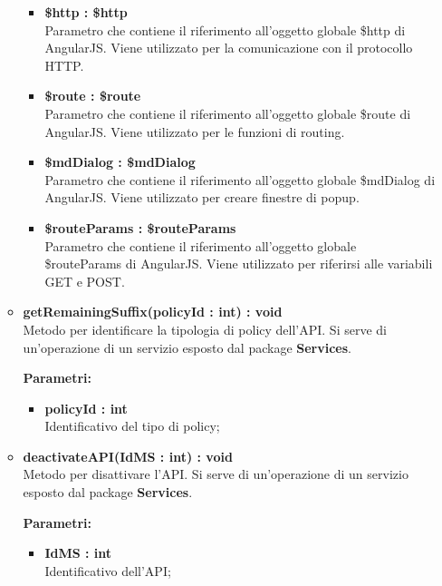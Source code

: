 \begin{itemize}
\begin{itemize}
\begin{itemize}
			\item \textbf{\$http : \$http}\\
			Parametro che contiene il riferimento all'oggetto globale \$http di AngularJS. Viene utilizzato per la comunicazione con il protocollo HTTP.
			
			\item \textbf{\$route : \$route}\\
			Parametro che contiene il riferimento all'oggetto globale \$route di AngularJS. Viene utilizzato per le funzioni di routing.
			
			\item \textbf{\$mdDialog : \$mdDialog}\\
			Parametro che contiene il riferimento all'oggetto globale \$mdDialog di AngularJS. Viene utilizzato per creare finestre di popup.
			
			\item \textbf{\$routeParams : \$routeParams}\\
			Parametro che contiene il riferimento all'oggetto globale \$routeParams di AngularJS. Viene utilizzato per riferirsi alle variabili GET e POST.
			
		\end{itemize}
		
		\item \textbf{getRemainingSuffix(policyId : int) : void}\\
		Metodo per identificare la tipologia di policy dell'API. Si serve di un'operazione di un servizio esposto dal package \textbf{Services}.
		\begin{description}
			\item[\textbf{Parametri:}]
		\end{description}
		\begin{itemize}
			\item \textbf{policyId : int}\\
			Identificativo del tipo di policy;
		\end{itemize}
		
		\item \textbf{deactivateAPI(IdMS : int) : void}\\
		Metodo per disattivare l'API. Si serve di un'operazione di un servizio esposto dal package \textbf{Services}.
		\begin{description}
			\item[\textbf{Parametri:}]
		\end{description}
		\begin{itemize}
			\item \textbf{IdMS : int}\\
			Identificativo dell'API;
		\end{itemize}
		

\end{itemize}
\end{itemize}
